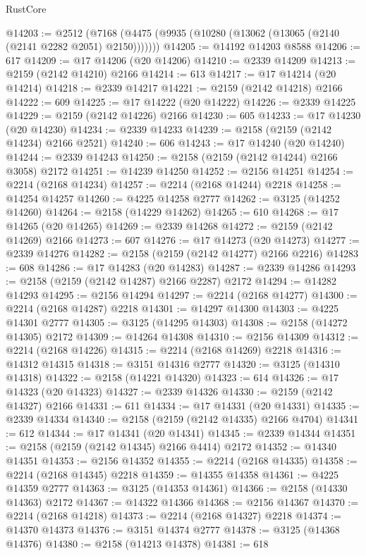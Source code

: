 \begin{lexlean}{RustCore}
\begin{coremodule}
@14203 := @2512 (@7168 (@4475 (@9935 (@10280 (@13062 (@13065 (@2140 (@2141 @2282 @2051) @2150)))))))
@14205 := @14192 @14203 @8588
@14206 := 617
@14209 := @17 @14206 (@20 @14206)
@14210 := @2339 @14209
@14213 := @2159 (@2142 @14210) @2166
@14214 := 613
@14217 := @17 @14214 (@20 @14214)
@14218 := @2339 @14217
@14221 := @2159 (@2142 @14218) @2166
@14222 := 609
@14225 := @17 @14222 (@20 @14222)
@14226 := @2339 @14225
@14229 := @2159 (@2142 @14226) @2166
@14230 := 605
@14233 := @17 @14230 (@20 @14230)
@14234 := @2339 @14233
@14239 := @2158 (@2159 (@2142 @14234) @2166 @2521)
@14240 := 606
@14243 := @17 @14240 (@20 @14240)
@14244 := @2339 @14243
@14250 := @2158 (@2159 (@2142 @14244) @2166 @3058) @2172
@14251 := @14239 @14250
@14252 := @2156 @14251
@14254 := @2214 (@2168 @14234)
@14257 := @2214 (@2168 @14244) @2218
@14258 := @14254 @14257
@14260 := @4225 @14258 @2777
@14262 := @3125 (@14252 @14260)
@14264 := @2158 (@14229 @14262)
@14265 := 610
@14268 := @17 @14265 (@20 @14265)
@14269 := @2339 @14268
@14272 := @2159 (@2142 @14269) @2166
@14273 := 607
@14276 := @17 @14273 (@20 @14273)
@14277 := @2339 @14276
@14282 := @2158 (@2159 (@2142 @14277) @2166 @2216)
@14283 := 608
@14286 := @17 @14283 (@20 @14283)
@14287 := @2339 @14286
@14293 := @2158 (@2159 (@2142 @14287) @2166 @2287) @2172
@14294 := @14282 @14293
@14295 := @2156 @14294
@14297 := @2214 (@2168 @14277)
@14300 := @2214 (@2168 @14287) @2218
@14301 := @14297 @14300
@14303 := @4225 @14301 @2777
@14305 := @3125 (@14295 @14303)
@14308 := @2158 (@14272 @14305) @2172
@14309 := @14264 @14308
@14310 := @2156 @14309
@14312 := @2214 (@2168 @14226)
@14315 := @2214 (@2168 @14269) @2218
@14316 := @14312 @14315
@14318 := @3151 @14316 @2777
@14320 := @3125 (@14310 @14318)
@14322 := @2158 (@14221 @14320)
@14323 := 614
@14326 := @17 @14323 (@20 @14323)
@14327 := @2339 @14326
@14330 := @2159 (@2142 @14327) @2166
@14331 := 611
@14334 := @17 @14331 (@20 @14331)
@14335 := @2339 @14334
@14340 := @2158 (@2159 (@2142 @14335) @2166 @4704)
@14341 := 612
@14344 := @17 @14341 (@20 @14341)
@14345 := @2339 @14344
@14351 := @2158 (@2159 (@2142 @14345) @2166 @4414) @2172
@14352 := @14340 @14351
@14353 := @2156 @14352
@14355 := @2214 (@2168 @14335)
@14358 := @2214 (@2168 @14345) @2218
@14359 := @14355 @14358
@14361 := @4225 @14359 @2777
@14363 := @3125 (@14353 @14361)
@14366 := @2158 (@14330 @14363) @2172
@14367 := @14322 @14366
@14368 := @2156 @14367
@14370 := @2214 (@2168 @14218)
@14373 := @2214 (@2168 @14327) @2218
@14374 := @14370 @14373
@14376 := @3151 @14374 @2777
@14378 := @3125 (@14368 @14376)
@14380 := @2158 (@14213 @14378)
@14381 := 618

\end{coremodule}
\end{lexlean}
